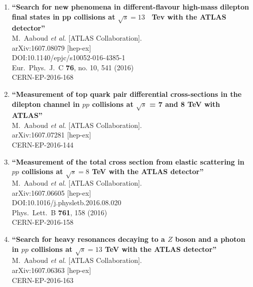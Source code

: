 \documentclass{article}
\begin{document}
\begin{enumerate}
\item%
{\bf ``Search for new phenomena in different-flavour high-mass dilepton final states in pp collisions at $\sqrt{s}=13$  Tev with the ATLAS detector''}
  \\{}M.~Aaboud {\it et al.} [ATLAS Collaboration].
  \\{}arXiv:1607.08079 [hep-ex]
  \\{}DOI:10.1140/epjc/s10052-016-4385-1
  \\{}Eur.\ Phys.\ J.\ C {\bf 76}, no. 10, 541 (2016)
  \\{}CERN-EP-2016-168

\item%
{\bf ``Measurement of top quark pair differential cross-sections in the dilepton channel in $pp$ collisions at $\sqrt{s}$ = 7 and 8 TeV with ATLAS''}
  \\{}M.~Aaboud {\it et al.} [ATLAS Collaboration].
  \\{}arXiv:1607.07281 [hep-ex]
  \\{}CERN-EP-2016-144
\item%
{\bf ``Measurement of the total cross section from elastic scattering in $pp$ collisions at $\sqrt{s}=8$ TeV with the ATLAS detector''}
  \\{}M.~Aaboud {\it et al.} [ATLAS Collaboration].
  \\{}arXiv:1607.06605 [hep-ex]
  \\{}DOI:10.1016/j.physletb.2016.08.020
  \\{}Phys.\ Lett.\ B {\bf 761}, 158 (2016)
  \\{}CERN-EP-2016-158
\item%
{\bf ``Search for heavy resonances decaying to a $Z$ boson and a photon in $pp$ collisions at $\sqrt{s}=13$ TeV with the ATLAS detector''}
  \\{}M.~Aaboud {\it et al.} [ATLAS Collaboration].
  \\{}arXiv:1607.06363 [hep-ex]
  \\{}CERN-EP-2016-163

\end{enumerate}
\end{document}
